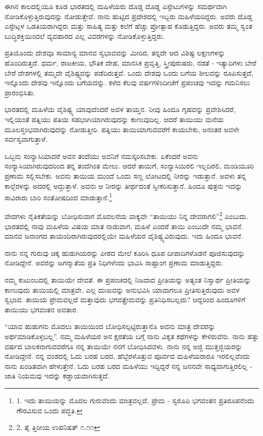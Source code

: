 ಈಗಿನ ಕಾಲದಲ್ಲಿಯೂ ಕೂಡ ಭಾರತದಲ್ಲಿ ಮಹಿಳೆಯರು ದೊಡ್ಡ ದೊಡ್ಡ ಎಸ್ಟೇಟುಗಳನ್ನು ಸಮರ್ಥವಾಗಿ ನೋಡಿಕೊಳ್ಳುತ್ತಿರುವುದನ್ನು ನೋಡುತ್ತೇವೆ. ನಾನು ಹುಟ್ಟಿದ ಪ್ರದೇಶದಲ್ಲಿ ಇಬ್ಬರು ಮಹಿಳೆಯರಿದ್ದರು. ಅವರು ದೊಡ್ಡ ಎಸ್ಟೇಟ್ಗಳ ಒಡತಿಯರಾಗಿದ್ದರು ಮತ್ತು ಸಾಹಿತ್ಯ ಮತ್ತು ಕಲೆಗೆ ಹೆಚ್ಚು ಪ್ರೋತ್ಸಾಹ ಕೊಡುತ್ತಿದ್ದರು. ಅವರು ತಮ್ಮ ಸ್ವಂತ ಬುದ್ಧಿಶಕ್ತಿಯಿಂದಲೆ ವ್ಯವಹಾರದ ಎಲ್ಲ ವಿವರಗಳನ್ನು ನೋಡಿಕೊಳ್ಳುತ್ತಿದ್ದರು.

ಪ್ರತಿಯೊಂದು ದೇಶವೂ ಸಾಮಾನ್ಯ ಮಾನವ ಸ್ವಭಾವವನ್ನು ಮೀರಿದ, ತನ್ನದೇ ಆದ ವಿಶಿಷ್ಟ ಲಕ್ಷಣಗಳನ್ನು ಹೊಂದಿರುತ್ತದೆ. ಧರ್ಮ, ರಾಜಕೀಯ, ಭೌತಿಕ ದೇಹ, ಮಾನಸಿಕ ಪ್ರವೃತ್ತಿ, ಸ್ತ್ರೀಪುರುಷರು, ನಡತೆ - ಇತ್ಯಾದಿಗಳು ಬೇರೆ ಬೇರೆ ದೇಶಗಳಲ್ಲಿ ತಮ್ಮದೇ ವೈಶಿಷ್ಟ್ಯವನ್ನು ಪಡೆದಿರುತ್ತವೆ. ಒಂದು ದೇಶವು ಒಂದು ಬಗೆಯ ಶೀಲವನ್ನು ರೂಪಿಸುತ್ತದೆ, ಇನ್ನೊಂದು ದೇಶವು ಇನ್ನೊಂದು ಬಗೆಯದನ್ನು. ಕಳೆದ ಕೆಲವು ವರ್ಷಗಳಿಂದೀಚೆಗೆ ಪ್ರಪಂಚವು ಇದನ್ನು ಗಮನಿಸಲು ಪ್ರಾರಂಭಿಸಿತು.

ಭಾರತದಲ್ಲಿ ಮಹಿಳೆಯ ವೈಶಿಷ್ಟ್ಯ ಯಾವುದೆಂದರೆ ಅವಳ ತಾಯ್ತನ. ನೀವು ಹಿಂದೂ ಗೃಹವನ್ನು ಪ್ರವೇಶಿಸಿದರೆ, ಇಲ್ಲಿಯಂತೆ ಪತ್ನಿಯು ಪತಿಯ ಸಹಭಾಗಿಯಾಗಿರುವುದನ್ನು ಕಾಣುವುದಿಲ್ಲ. ಆದರೆ ತಾಯಿಯು ಮನೆಯ ಮೂಲಸ್ತಂಭವಾಗಿರುವುದನ್ನು ನೋಡುತ್ತೀರಿ. ಪತ್ನಿಯು ತಾಯಿಯಾಗುವವರೆಗೆ ಕಾಯಬೇಕು, ಅನಂತರ ಅವಳೇ ಸರ್ವಸ್ವವಾಗುತ್ತಾಳೆ.

ಒಬ್ಬನು ಸಂನ್ಯಾಸಿಯಾದರೆ ಅವನ ತಂದೆಯು ಅವನಿಗೆ ನಮಸ್ಕರಿಸಬೇಕು. ಏಕೆಂದರೆ ಅವನು ಸಂನ್ಯಾಸಿಯಾಗಿರುವುದರಿಂದ ತನ್ನ ತಂದೆಗಿಂತ ಮೇಲು. ಆದರೆ ತಾಯಿಗೆ, ಸಂನ್ಯಾಸಿಯಿರಲಿ ಇಲ್ಲದಿರಲಿ, ಮಂಡಿಯೂರಿ ಪ್ರಣಾಮ ಸಲ್ಲಿಸಬೇಕು. ಅವನು ತಾಯಿಯ ಮುಂದೆ ಒಂದು ಸಣ್ಣ ಲೋಟದಲ್ಲಿ ನೀರನ್ನು ಇಡುತ್ತಾನೆ. ಅವಳು ತನ್ನ ಕಾಲ್ಬೆರಳನ್ನು ಅದರಲ್ಲಿ ಅದ್ದುತ್ತಾಳೆ. ಅವನು ಆ ನೀರನ್ನು ತೀರ್ಥದಂತೆ ಸ್ವೀಕರಿಸುತ್ತಾನೆ. ಹಿಂದೂ ಪುತ್ರನು ಇದನ್ನು ಸಾವಿರಾರು ಬಾರಿ ಸಂತೋಷದಿಂದ ಮಾಡುತ್ತಾನೆ.\footnote{1. ಇದು ತಾಯಿಯನ್ನು ಮೊದಲ ಗುರುವೆಂದು ಮಾತ್ರವಲ್ಲದೆ, ಪ್ರೇಮ - ಸ್ವರೂಪಿ ಭಗವಂತನ ಪ್ರತಿರೂಪನೆಂದು ಗೌರವಿಸುವ ಒಂದು ಪದ್ಧತಿ.}

ವೇದಗಳು ನೈತಿಕತೆಯನ್ನು ಬೋಧಿಸುವಾಗ ಮೊದಲನೆಯ ವಾಕ್ಯವೇ “ತಾಯಿಯು ನಿನ್ನ ದೇವರಾಗಲಿ”\footnote{2. ತೈ ತ್ತಿರೀಯ ಉಪನಿಷತ್ ೧.೧೧} ಎಂಬುದು. ಭಾರತದಲ್ಲಿ ನಾವು ಮಹಿಳೆಯ ವಿಷಯ ಮಾತ ನಾಡುವಾಗ, ಮಹಿಳೆ ಎಂದರೆ ತಾಯಿ ಎಂಬುದೇ ನಮ್ಮ ಭಾವನೆ. ಮಾನವ ಜನಾಂಗದ ತಾಯಂದಿರಾಗಿರುವುದರಲ್ಲಿಯೇ ಮಹಿಳೆಯರ ವೈಶಿಷ್ಟ್ಯವಿರುವುದು. ಇದು ಹಿಂದೂ ಭಾವನೆ.

ನಾನು ನನ್ನ ಗುರುವು ಚಿಕ್ಕ ಹುಡುಗಿಯರನ್ನು ಪೀಠದ ಮೇಲೆ ಕೂರಿಸಿ ಧೂಪ ದೀಪಾದಿಗಳೊಡನೆ ಪೂಜಿಸುವುದನ್ನು ನೋಡಿದ್ದೇನೆ. ಅವರನ್ನು ಜಗನ್ಮಾತೆಯ ಪ್ರತಿ ನಿಧಿಗಳೆಂದು ಭಾವಿಸಿ ಸಾಷ್ಟಾಂಗ ಪ್ರಣಾಮ ಮಾಡುತ್ತಿದ್ದರು.

ನಮ್ಮ ಕುಟುಂಬದಲ್ಲಿ ತಾಯಿಯೇ ದೇವತೆ. ಈ ಪ್ರಪಂಚದಲ್ಲಿ ನಿಜವಾದ ಪ್ರೀತಿಯನ್ನು ಅತ್ಯಂತ ನಿಸ್ವಾರ್ಥ ಪ್ರೀತಿಯನ್ನು ಕಾಣುವುದು ತಾಯಿಯಲ್ಲಿ ಮಾತ್ರವೇ. ಎಲ್ಲ ದುಃಖವನ್ನು ಅನುಭವಿಸಿ ಯಾವಾಗಲೂ ಪ್ರೀತಿಸುತ್ತಿರುವುದು ಅವಳ ಸ್ವಭಾವ. ತಾಯಿಯ ಪ್ರೇಮವಲ್ಲದೆ ಮತ್ತಾವುದು ಭಗವತ್ಪ್ರೇಮವನ್ನು ಪ್ರತಿನಿಧಿಸಬಲ್ಲದು? ಆದ್ದರಿಂದ ಹಿಂದೂಗಳಿಗೆ ತಾಯಿಯು ಭಗವಂತನ ಅವತಾರ.

“ಯಾವ ಹುಡುಗನು ಮೊದಲು ತಾಯಿಯಿಂದ ಬೋಧಿಸಲ್ಪಟ್ಟಿರುತ್ತಾನೊ ಅವನು ಮಾತ್ರ ದೇವರನ್ನು ಅರ್ಥಮಾಡಿಕೊಳ್ಳಬಲ್ಲ”. ನಮ್ಮ ಮಹಿಳೆಯರ ಅನ ಕ್ಷರತೆಯ ಬಗ್ಗೆ ನಾನು ವಿಕೃತ ಕಥೆಗಳನ್ನು ಕೇಳಿರುವೆನು. ನಾನು ಹತ್ತು ವರ್ಷದ ಬಾಲಕನಾಗುವವರೆಗೂ ನನ್ನ ತಾಯಿಯೇ ನನಗೆ ಬೋಧಿಸಿದವಳು. ನಾನು ನನ್ನ ಅಜ್ಜಿ ಮುತ್ತಜ್ಜಿಯರನ್ನು ನೋಡಿದ್ದೇನೆ. ನನ್ನ ವಂಶದಲ್ಲಿ ಓದು ಬರಹ ಬರದ, ಹೆಬ್ಬೆರಳೊತ್ತುವ ಪೂರ್ವದ ಮಹಿಳೆಯರಾರೂ ಇರಲಿಲ್ಲವೆಂದು ನಾನು ಖಂಡಿತವಾಗಿ ಹೇಳುತ್ತೇನೆ. ಓದು ಬರಹ ಬರದ ಮಹಿಳೆಯು ಇದ್ದಿದ್ದರೆ ನನ್ನ ಜನನವೇ ಸಾಧ್ಯವಾಗುತ್ತಿರಲಿಲ್ಲ - ಜಾತಿ ನಿಯಮವು ಇದನ್ನು ಕಡ್ಡಾಯವಾಗಿಸುತ್ತದೆ.

